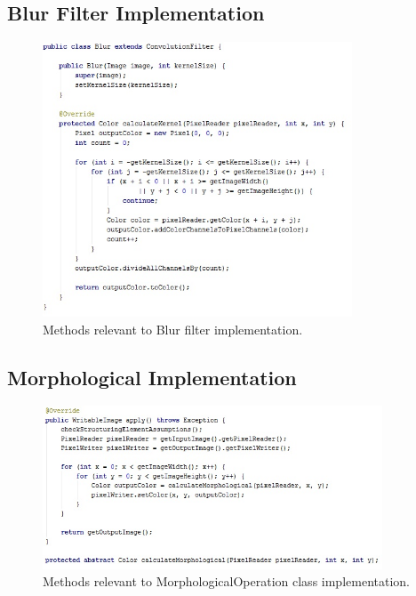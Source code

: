 \documentclass{article}
\begin{document}
\subsection{Blur Filter Implementation} \label{blur_impl}
\begin{figure}[H]
	\centering
	\includegraphics[width=0.82\textwidth]{_Figures/code/blur.jpg}
    \caption{Methods relevant to Blur filter implementation.}
    \label{fig:code:blur}
\end{figure}

%
%
\subsection{Morphological Implementation} \label{morph_impl}
\begin{figure}[H]
	\centering
	\includegraphics[width=0.9\textwidth]{_Figures/code/morph_1.jpg}
    \caption{Methods relevant to MorphologicalOperation class implementation.}
    \label{fig:code:blur}
\end{figure}
\end{document}
